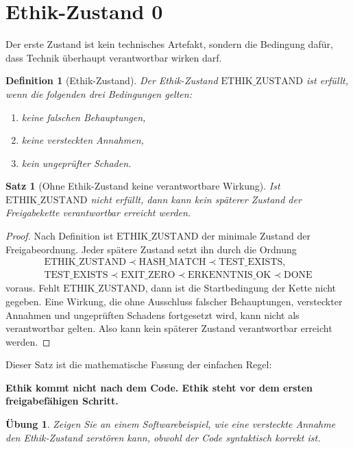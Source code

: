 \documentclass[11pt,a4paper,oneside]{scrartcl}
\theoremstyle{qikstyle}
\newtheorem{definition}{Definition}[section]
\newtheorem{satz}{Satz}[section]
\newtheorem{uebung}{Übung}[section]
\newcommand{\DONE}{\mathrm{DONE}}
\newcommand{\HASH}{\mathrm{HASH\_MATCH}}
\newcommand{\TEST}{\mathrm{TEST\_EXISTS}}
\newcommand{\EXIT}{\mathrm{EXIT\_ZERO}}
\newcommand{\ERK}{\mathrm{ERKENNTNIS\_OK}}
\newcommand{\ETH}{\mathrm{ETHIK\_ZUSTAND}}
\newenvironment{merksatz}{\begin{center}\begin{minipage}{0.92\linewidth}\sffamily\bfseries}{\end{minipage}\end{center}}
\begin{document}
\section{Ethik-Zustand 0}

Der erste Zustand ist kein technisches Artefakt, sondern die Bedingung dafür, dass Technik überhaupt verantwortbar wirken darf.

\begin{definition}[Ethik-Zustand]
Der Ethik-Zustand \(\ETH\) ist erfüllt, wenn die folgenden drei Bedingungen gelten:
\begin{enumerate}
\item keine falschen Behauptungen,
\item keine versteckten Annahmen,
\item kein ungeprüfter Schaden.
\end{enumerate}
\end{definition}

\begin{satz}[Ohne Ethik-Zustand keine verantwortbare Wirkung]
Ist \(\ETH\) nicht erfüllt, dann kann kein späterer Zustand der Freigabekette verantwortbar erreicht werden.
\end{satz}

\begin{proof}
Nach Definition ist \(\ETH\) der minimale Zustand der Freigabeordnung. Jeder spätere Zustand setzt ihn durch die Ordnung
\[
\begin{gathered}
\ETH \prec \HASH \prec \TEST,\\
\TEST \prec \EXIT \prec \ERK \prec \DONE
\end{gathered}
\]
voraus. Fehlt \(\ETH\), dann ist die Startbedingung der Kette nicht gegeben. Eine Wirkung, die ohne Ausschluss falscher Behauptungen, versteckter Annahmen und ungeprüften Schadens fortgesetzt wird, kann nicht als verantwortbar gelten. Also kann kein späterer Zustand verantwortbar erreicht werden.
\end{proof}

Dieser Satz ist die mathematische Fassung der einfachen Regel:

\begin{merksatz}
Ethik kommt nicht nach dem Code. Ethik steht vor dem ersten freigabefähigen Schritt.
\end{merksatz}

\begin{uebung}
Zeigen Sie an einem Softwarebeispiel, wie eine versteckte Annahme den Ethik-Zustand zerstören kann, obwohl der Code syntaktisch korrekt ist.
\end{uebung}
\newpage
\end{document}
